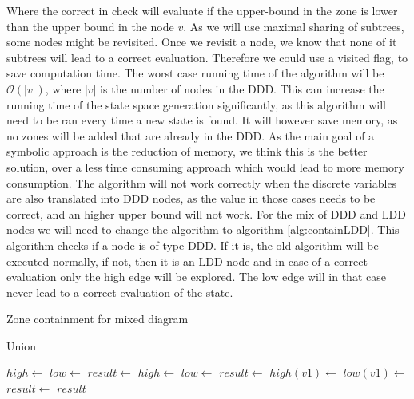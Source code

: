 \documentclass[11pt]{article}
\begin{document}
Where the correct in check will evaluate if the upper-bound in the zone is lower than the upper bound in the node $v$. As we will use maximal sharing of subtrees, some nodes might be revisited. Once we revisit a node, we know that none of it subtrees will lead to a correct evaluation. Therefore we could use a visited flag, to save computation time. The worst case running time of the algorithm will be $\mathcal{O}(|v|)$, where $|v|$ is the number of nodes in the DDD. This can increase the running time of the state space generation significantly, as this algorithm will need to be ran every time a new state is found. It will however save memory, as no zones will be added that are already in the DDD. As the main goal of a symbolic approach is the reduction of memory, we think this is the better solution, over a less time consuming approach which would lead to more memory consumption. The algorithm will not work correctly when the discrete variables are also translated into DDD nodes, as the value in those cases needs to be correct, and an higher upper bound will not work. For the mix of DDD and LDD nodes we will need to change the algorithm to algorithm \ref{alg:containLDD}. This algorithm checks if a node is of type DDD. If it is, the old algorithm will be executed normally, if not, then it is an LDD node and in case of a correct evaluation only the high edge will be explored. The low edge will in that case never lead to a correct evaluation of the state.

\begin{algorithm}
\begin{algorithmic}[1]
\caption{Zone containment for mixed diagram}\label{alg:containLDD}
	\EndIf
				\Return{\True}
			\EndIf
		\EndIf 
	\EndIf
\EndProcedure
\end{algorithmic}
\end{algorithm}

\begin{algorithm}
\begin{algorithmic}[1]
\caption{Union}\label{alg:union}
	\EndIf
	\EndIf
	\EndIf
		\State $high \gets$ 
		\State $low \gets$ 
		\State $result \gets$ 
	\EndIf
		\State $high \gets$ 
		\State $low \gets$ 
		\State $result \gets$ 
	\EndIf
		\State $high(v1) \gets$ 
		\State $low(v1) \gets$ 
		\State $result \gets$ 
	\EndIf
	\Return $result$
\EndProcedure
\end{algorithmic}
\end{algorithm}
\end{document}
